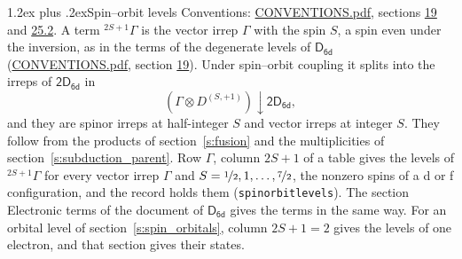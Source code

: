 \documentclass[10pt,a4paper]{article}
\makeatletter
\renewcommand\section{\@startsection{section}{1}{\z@}{-3ex plus -1ex minus -.2ex}%
  {1.2ex plus .2ex}{\normalfont\large\sffamily\bfseries\color{parttitle}}}
\numberwithin{equation}{section}
\newcommand{\grp}[1]{\mathsf{#1}}
\newcommand{\restr}[2]{#1\!\downarrow#2}
\newcommand{\irrJp}[2]{D^{(#1,#2)}}
\newcommand{\irrprod}{\otimes}
\newcommand{\term}[2]{{}^{#1}#2}
\makeatother
\begin{document}
\section{Spin--orbit levels}\label{s:spin_orbit}
Conventions: \href{../../CONVENTIONS.pdf}{CONVENTIONS.pdf}, sections \href{../../../rotation/CONVENTIONS.pdf\#conv.19}{19} and \href{../../CONVENTIONS.pdf\#conv.25.2}{25.2}.
\leavevmode\label{n:local.spin}\label{n:symbol.term}A term $\term{2S+1}{\Gamma}$ is the vector irrep $\Gamma$ with the spin $S$, a spin even under the inversion, as in the terms of the degenerate levels of \href{../../../rotation/data/pdf/D6d.pdf}{$\grp{D_{6d}}$} (\href{../../CONVENTIONS.pdf}{CONVENTIONS.pdf}, section \href{../../../rotation/CONVENTIONS.pdf\#conv.19}{19}). Under spin--orbit coupling it splits into the irreps of $\grp{2D_{6d}}$ in
\begin{equation}\label{e:spinorbit}\restr{(\Gamma \irrprod \irrJp{S}{+1})}{\grp{2D_{6d}}},\end{equation}
and they are spinor irreps at half-integer $S$ and vector irreps at integer $S$. They follow from the products of section~\ref{s:fusion} and the multiplicities of section~\ref{s:subduction_parent}. Row $\Gamma$, column $2S + 1$ of a table gives the levels of $\term{2S+1}{\Gamma}$ for every vector irrep $\Gamma$ and $S = \nicefrac{1}{2}, 1, \dots, \nicefrac{7}{2}$, the nonzero spins of a d or f configuration, and the record holds them (\texttt{spinorbitlevels}). The section Electronic terms of the document of \href{../../../rotation/data/pdf/D6d.pdf}{$\grp{D_{6d}}$} gives the terms in the same way. For an orbital level of section~\ref{s:spin_orbitals}, column $2S + 1 = 2$ gives the levels of one electron, and that section gives their states.
\end{document}
